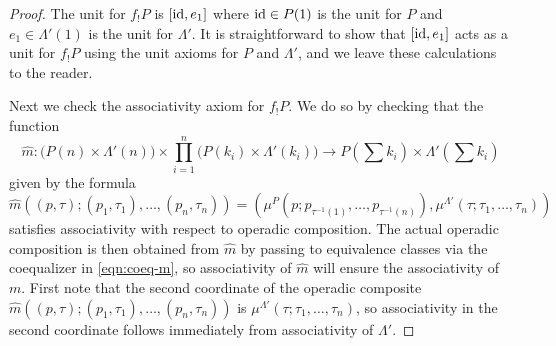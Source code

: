 \begin{proof}
The unit for $f_{!}P$ is $[\textrm{id}, e_1]$ where $\textrm{id} \in P(1)$ is the  unit for $P$ and $e_1 \in \Lambda'(1)$ is the unit for $\Lambda'$. It is straightforward to show that $[\textrm{id}, e_1]$ acts as a unit for $f_{!}P$ using the unit axioms for $P$ and $\Lambda'$, and we leave these calculations to the reader.

Next we check the associativity axiom for $f_{!}P$.
We do so by checking that the function
\[
\hat{m} \colon \big( P(n) \times \Lambda'(n) \big) \times \prod_{i=1}^n \big( P(k_i) \times \Lambda'(k_i) \big) \to P\left( \sum k_i\right) \times \Lambda'\left(\sum k_i\right)
\]
given by the formula
\[
\hat{m}\left(  (p,\tau); (p_1, \tau_1), \ldots, (p_n, \tau_n)             \right)  = \left( \mu^P(p; p_{\tau^{-1}(1)}, \ldots, p_{\tau^{-1}(n)}), \mu^{\Lambda'}(\tau; \tau_1, \ldots, \tau_n) \right)
\]
satisfies associativity with respect to operadic composition.
The actual operadic composition is then obtained from $\hat{m}$ by passing to equivalence classes via the coequalizer in \cref{eqn:coeq-m}, so associativity of $\hat{m}$ will ensure the associativity of $m$.
First note that the second coordinate of the operadic composite $\hat{m}\left(  (p,\tau); (p_1, \tau_1), \ldots, (p_n, \tau_n)             \right)$ is $\mu^{\Lambda'}(\tau; \tau_1, \ldots, \tau_n)$, so associativity in the second coordinate follows immediately from associativity of $\Lambda'$. 


\end{proof}
